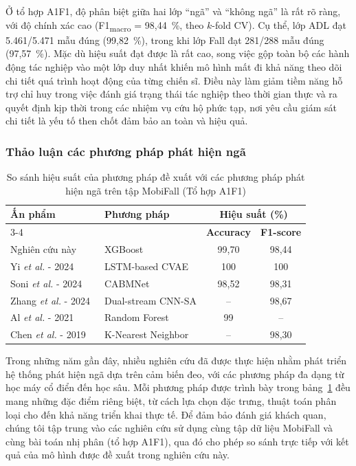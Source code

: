 Ở tổ hợp A1F1, độ phân biệt giữa hai lớp “ngã” và “không ngã” là rất rõ ràng, với độ chính xác cao (F1\textsubscript{macro} = 98,44~\%, theo $k$-fold CV). Cụ thể, lớp ADL đạt 5.461/5.471 mẫu đúng (99,82~\%), trong khi lớp Fall đạt 281/288 mẫu đúng (97,57~\%). Mặc dù hiệu suất đạt được là rất cao, song việc gộp toàn bộ các hành động tác nghiệp vào một lớp duy nhất khiến mô hình mất đi khả năng theo dõi chi tiết quá trình hoạt động của từng chiến sĩ. Điều này làm giảm tiềm năng hỗ trợ chỉ huy trong việc đánh giá trạng thái tác nghiệp theo thời gian thực và ra quyết định kịp thời trong các nhiệm vụ cứu hộ phức tạp, nơi yêu cầu giám sát chi tiết là yếu tố then chốt đảm bảo an toàn và hiệu quả.

\subsubsection{Thảo luận các phương pháp phát hiện ngã}

\begin{table}[t]
    \centering
    \caption{So sánh hiệu suất của phương pháp đề xuất với các phương pháp phát hiện ngã trên tập MobiFall (Tổ hợp A1F1)}
    \label{comparison_mobifall}
    \begin{tabular}{llcc}\hline\hline
        \multirow{2}{*}{\textbf{Ấn phẩm}} & \multirow{2}{*}{\textbf{Phương pháp}} & \multicolumn{2}{c}{\textbf{Hiệu suất (\%)}}\\\cline{3-4}
         &  & \textbf{Accuracy} & \textbf{F1-score}\\\hline
        Nghiên cứu này & XGBoost & 99,70 & 98,44\\
        Yi \textit{et al.} - 2024~\cite{yi2024fall} & LSTM-based CVAE & 100 & 100\\
        Soni \textit{et al.} - 2024~\cite{soni2024cabmnet} & CABMNet & 98,52 & 98,31\\
        Zhang \textit{et al.} - 2024~\cite{zhang2024effective} & Dual-stream CNN-SA & – & 98,67\\
        Al \textit{et al.} - 2021~\cite{al2021towards} & Random Forest & 99 & –\\
        Chen \textit{et al.} - 2019~\cite{chen2019detection} & K-Nearest Neighbor & – & 98,30\\\hline\hline
    \end{tabular}
\end{table}

Trong những năm gần đây, nhiều nghiên cứu đã được thực hiện nhằm phát triển hệ thống phát hiện ngã dựa trên cảm biến đeo, với các phương pháp đa dạng từ học máy cổ điển đến học sâu. Mỗi phương pháp được trình bày trong bảng~\ref{comparison_mobifall} đều mang những đặc điểm riêng biệt, từ cách lựa chọn đặc trưng, thuật toán phân loại cho đến khả năng triển khai thực tế. Để đảm bảo đánh giá khách quan, chúng tôi tập trung vào các nghiên cứu sử dụng cùng tập dữ liệu MobiFall và cùng bài toán nhị phân (tổ hợp A1F1), qua đó cho phép so sánh trực tiếp với kết quả của mô hình được đề xuất trong nghiên cứu này.

